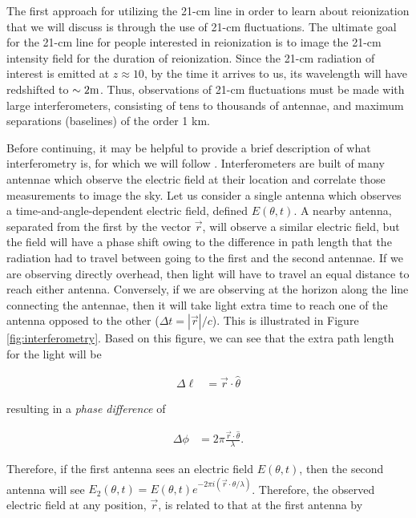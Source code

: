 The first approach for utilizing the 21-cm line in order to learn about reionization that we will discuss is through the use of 21-cm fluctuations. The ultimate goal for the 21-cm line for people interested in reionization is to image the 21-cm intensity field for the duration of reionization. Since the 21-cm radiation of interest is emitted at $z \approx 10$, by the time it arrives to us, its wavelength will have redshifted to $\sim 2\meter$. Thus, observations of 21-cm fluctuations must be made with large interferometers, consisting of tens to thousands of antennae, and maximum separations (baselines) of the order 1 km. 

Before continuing, it may be helpful to provide a brief description of what interferometry is, for which we will follow \cite{morales2009reionization}. Interferometers are built of many antennae which observe the electric field at their location and correlate those measurements to image the sky. Let us consider a single antenna which observes a time-and-angle-dependent electric field, defined $E(\theta,t)$. A nearby antenna, separated from the first by the vector $\vec{r}$, will observe a similar electric field, but the field will have a phase shift owing to the difference in path length that the radiation had to travel between going to the first and the second antennae. If we are observing directly overhead, then light will have to travel an equal distance to reach either antenna. Conversely, if we are observing at the horizon along the line connecting the antennae, then it will take light extra time to reach one of the antenna opposed to the other ($\Delta t = |\vec{r}|/c$). This is illustrated in Figure \ref{fig:interferometry}. Based on this figure, we can see that the extra path length for the light will be 

\begin{align}
\Delta \ell &= \vec{r}\cdot\hat{\theta}
\end{align}

resulting in a \textit{phase difference} of 

\begin{align}
\Delta \phi &= 2\pi \frac{\vec{r}\cdot\hat{\theta}}{\lambda}.
\end{align}


Therefore, if the first antenna sees an electric field $E(\theta,t)$, then the second antenna will see $E_2(\theta,t) = E(\theta,t)e^{-2\pi i (\vec{r}\cdot{\theta}/\lambda)}$. Therefore, the observed electric field at any position, $\vec{r}$, is related to that at the first antenna by

